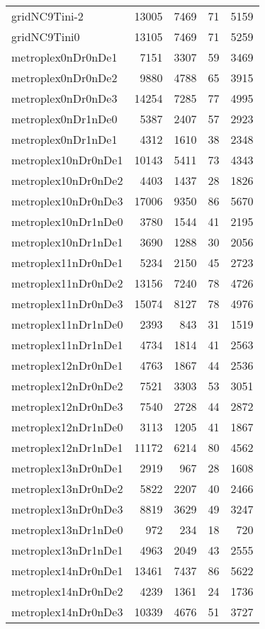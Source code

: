 \begin{longtable}{lrrrr}
gridNC9Tini-2 & 13005 & 7469 & 71 & 5159 \\
gridNC9Tini0 & 13105 & 7469 & 71 & 5259 \\
metroplex0nDr0nDe1 & 7151 & 3307 & 59 & 3469 \\
metroplex0nDr0nDe2 & 9880 & 4788 & 65 & 3915 \\
metroplex0nDr0nDe3 & 14254 & 7285 & 77 & 4995 \\
metroplex0nDr1nDe0 & 5387 & 2407 & 57 & 2923 \\
metroplex0nDr1nDe1 & 4312 & 1610 & 38 & 2348 \\
metroplex10nDr0nDe1 & 10143 & 5411 & 73 & 4343 \\
metroplex10nDr0nDe2 & 4403 & 1437 & 28 & 1826 \\
metroplex10nDr0nDe3 & 17006 & 9350 & 86 & 5670 \\
metroplex10nDr1nDe0 & 3780 & 1544 & 41 & 2195 \\
metroplex10nDr1nDe1 & 3690 & 1288 & 30 & 2056 \\
metroplex11nDr0nDe1 & 5234 & 2150 & 45 & 2723 \\
metroplex11nDr0nDe2 & 13156 & 7240 & 78 & 4726 \\
metroplex11nDr0nDe3 & 15074 & 8127 & 78 & 4976 \\
metroplex11nDr1nDe0 & 2393 & 843 & 31 & 1519 \\
metroplex11nDr1nDe1 & 4734 & 1814 & 41 & 2563 \\
metroplex12nDr0nDe1 & 4763 & 1867 & 44 & 2536 \\
metroplex12nDr0nDe2 & 7521 & 3303 & 53 & 3051 \\
metroplex12nDr0nDe3 & 7540 & 2728 & 44 & 2872 \\
metroplex12nDr1nDe0 & 3113 & 1205 & 41 & 1867 \\
metroplex12nDr1nDe1 & 11172 & 6214 & 80 & 4562 \\
metroplex13nDr0nDe1 & 2919 & 967 & 28 & 1608 \\
metroplex13nDr0nDe2 & 5822 & 2207 & 40 & 2466 \\
metroplex13nDr0nDe3 & 8819 & 3629 & 49 & 3247 \\
metroplex13nDr1nDe0 & 972 & 234 & 18 & 720 \\
metroplex13nDr1nDe1 & 4963 & 2049 & 43 & 2555 \\
metroplex14nDr0nDe1 & 13461 & 7437 & 86 & 5622 \\
metroplex14nDr0nDe2 & 4239 & 1361 & 24 & 1736 \\
metroplex14nDr0nDe3 & 10339 & 4676 & 51 & 3727 \\

\end{longtable}
